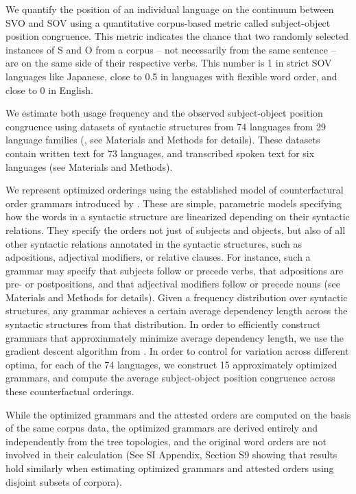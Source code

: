 \documentclass[9pt,twocolumn,twoside,lineno]{pnas-new}
\begin{document}
We quantify the position of an individual language on the continuum between SVO and SOV using a quantitative corpus-based metric called subject-object position congruence.
This metric indicates the chance that two randomly selected instances of S and O from a corpus -- not necessarily from the same sentence -- are on the same side of their respective verbs. This number is 1 in strict SOV languages like Japanese, close to 0.5 in languages with flexible word order, and close to 0 in English.


We estimate both usage frequency and the observed subject-object position congruence using datasets of syntactic structures from 74 languages from 29 language families (\citep{zeman2020universal}, see Materials and Methods for details).
These datasets contain written text for 73 languages, and transcribed spoken text for six languages (see Materials and Methods).

We represent optimized orderings using the  established model of counterfactural order grammars introduced by \cite{gildea-optimizing-2007}.
These are simple, parametric models specifying how the words in a syntactic structure are linearized depending on their syntactic relations.
They specify the orders not just of subjects and objects, but also of all other syntactic relations annotated in the syntactic structures, such as adpositions, adjectival modifiers, or relative clauses.
For instance, such a grammar may specify that subjects follow or precede verbs, that adpositions are pre- or postpositions, and that adjectival modifiers follow or precede nouns (see Materials and Methods for details).
Given a frequency distribution over syntactic structures, any grammar achieves a certain average dependency length across the syntactic structures from that distribution.
In order to efficiently construct grammars that approxinmately minimize average dependency length, we use the gradient descent algorithm from \cite{hahn2020universals}.
In order to control for variation across different optima, for each of the 74 languages, we construct 15 approximately optimized grammars, and compute the average subject-object position congruence across these counterfactual orderings.




While the optimized grammars and the attested orders are computed on the basis of the same corpus data, the optimized grammars are derived entirely and independently from the tree topologies, and the original word orders are not involved in their calculation (See SI Appendix, Section S9 showing that results hold similarly when estimating optimized grammars and attested orders using disjoint subsets of corpora).
\end{document}
